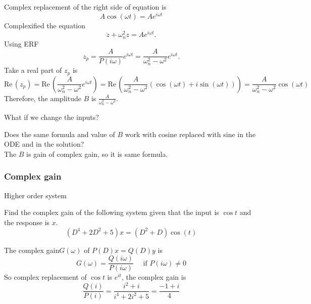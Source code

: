 Complex replacement of the  right side of equation is
\begin{equation*}
  A \cos (\omega t) = A e^{i \omega t}
\end{equation*}
Complexified the equation
\begin{equation*}
  \ddot z+\omega _ n^2z = A e^{i \omega t}. 
\end{equation*}
Using ERF
\begin{equation*}
  z_ p = \frac{A}{P(i \omega)} e^{i \omega t} = \frac{A}{\omega _ n^2 - \omega ^2} e^{i \omega t}.  
\end{equation*}
Take a real part of $z_ p$ is
\begin{equation*}
  \mathrm{Re\, }(z_p) = \mathrm{Re\, }(\frac{A}{\omega _ n^2 - \omega ^2} e^{i \omega t})
  = \mathrm{Re\, }
  \left( \frac{A}{\omega _ n^2 - \omega ^2} \left( \cos(\omega t) + i \sin (\omega t) \right) \right)
  = \frac{A}{\omega _ n^2 - \omega ^2} \cos (\omega t)
\end{equation*}
Therefore, the amplitude $B$ is $ \frac{A}{\omega _ n^2 - \omega ^2}$.

\begin{problem}
  What if we change the inputs?
\end{problem}
Does the same formula and value of $B$ work with cosine replaced
with sine in the ODE and in the solution? \\
The $B$ is gain of complex gain, so it is same formula.   
\clearpage
\subsubsection{Complex gain}
\begin{problem}
  Higher order system
\end{problem}
Find the complex gain of the following system given
that the input is $\cos ⁡t$ and the response is $x$.
\begin{equation*}
  (D^4+2D^2+5)x = (D^2+D)\cos (t)
\end{equation*}

The complex gain$G(\omega)$ of $P(D)x = Q(D)y$ is
\begin{equation*}
  G(\omega) = \frac{Q(i \omega)}{P(i \omega)} \quad \text{ if } P(i \omega) \neq 0
\end{equation*}
So complex replacement of $\cos t$ is $e^{it}$, the complex gain is
\begin{equation*}
  \frac{Q(i)}{P(i)} = \frac{i^2 + i}{i^4 + 2i^2 + 5} = \frac{-1 + i}{4}
\end{equation*}

